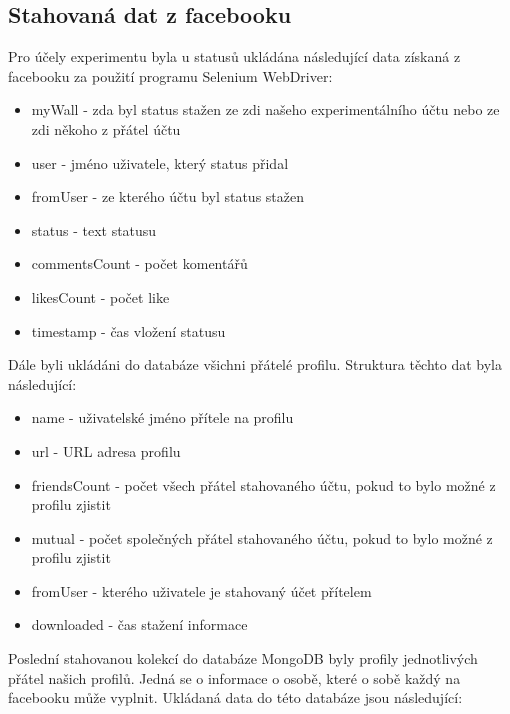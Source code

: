 \documentclass[thesis=M,czech]{FITthesis}[2013/05/10]
\begin{document}
\subsection{Stahovaná dat z facebooku}

Pro účely experimentu byla u statusů ukládána následující data získaná z facebooku za použití programu Selenium WebDriver:

\begin{itemize}
  \item myWall - zda byl status stažen ze zdi našeho experimentálního účtu nebo ze zdi někoho z přátel účtu
  \item user - jméno uživatele, který status přidal
  \item fromUser - ze kterého účtu byl status stažen  
  \item status - text statusu
  \item commentsCount - počet komentářů
  \item likesCount - počet like
  \item timestamp - čas vložení statusu
\end{itemize}

Dále byli ukládáni do databáze všichni přátelé profilu. Struktura těchto dat byla následující:

\begin{itemize}
  \item name - uživatelské jméno přítele na profilu
  \item url - URL adresa profilu
  \item friendsCount - počet všech přátel stahovaného účtu, pokud to bylo možné z profilu zjistit
  \item mutual - počet společných přátel stahovaného účtu, pokud to bylo možné z profilu zjistit
  \item fromUser - kterého uživatele je stahovaný účet přítelem
  \item downloaded - čas stažení informace
\end{itemize}

Poslední stahovanou kolekcí do databáze MongoDB byly profily jednotlivých přátel našich profilů. Jedná se o informace o osobě, které o sobě každý na facebooku může vyplnit. Ukládaná data do této databáze jsou následující:
\end{document}
